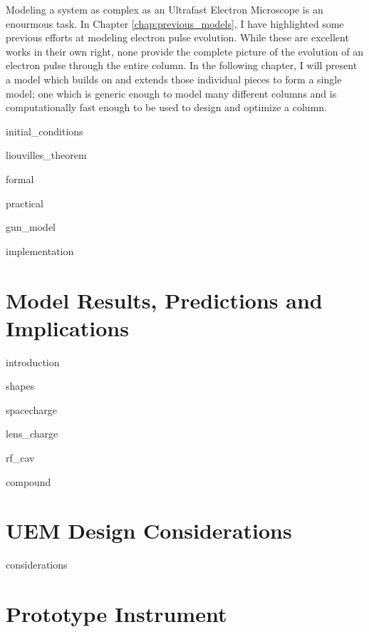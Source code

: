 \documentclass{uicthesi}
\begin{document}
Modeling a system as complex as an Ultrafast Electron Microscope is an enourmous task.
In Chapter \ref{chap:previous_models}, I have highlighted some previous efforts at modeling electron pulse evolution.
While these are excellent works in their own right, none provide the complete picture of the evolution of an electron pulse through the entire column.
In the following chapter, I will present a model which builds on and extends those individual pieces to form a single model; one which is generic enough to model many different columns and is computationally fast enough to be used to design and optimize a column.

  {initial_conditions}

  {liouvilles_theorem}


  {formal}

  {practical}

  {gun_model}

  {implementation}

\chapter{Model Results, Predictions and Implications} \label{chap:model_results}

  {introduction}

  {shapes}

  {spacecharge}

  {lens_charge}

  {rf_cav}

  {compound}

\chapter{UEM Design Considerations} \label{chap:considerations}

  {considerations}

\chapter{Prototype Instrument} \label{chap:prototype}
\end{document}
